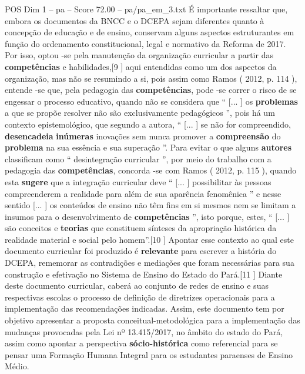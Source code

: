 \begin{textsample}{POS Dim 1 – pa – Score 72.00 – pa/pa\_em\_3.txt}
É importante ressaltar que, embora os documentos da BNCC e o DCEPA sejam diferentes quanto à concepção de educação e de ensino, conservam alguns aspectos estruturantes em função do ordenamento constitucional, legal e normativo da Reforma de 2017.
Por isso, optou -se pela manutenção da organização curricular a partir das \textbf{competências} e habilidades,[9 ] aqui entendidas como um dos aspectos da organização, mas não se resumindo a si, pois assim como Ramos ( 2012, p. 114 ), entende -se que, pela pedagogia das \textbf{competências}, pode -se correr o risco de se engessar o processo educativo, quando não se considera que “ [... ] os \textbf{problemas} a que se propõe resolver não são exclusivamente pedagógicos ”, pois há um contexto epistemológico, que segundo a autora, “ [... ] se não for compreendido, \textbf{desencadeia} \textbf{inúmeras} inovações sem nunca promover a \textbf{compreensão} do \textbf{problema} na sua essência e sua superação ”.
Para evitar o que alguns \textbf{autores} classificam como “ desintegração curricular ”, por meio do trabalho com a pedagogia das \textbf{competências}, concorda -se com Ramos ( 2012, p. 115 ), quando esta \textbf{sugere} que a integração curricular deve “ [... ] possibilitar às pessoas compreenderem a realidade para além de sua aparência fenomênica ” e nesse sentido [... ] os conteúdos de ensino não têm fins em si mesmos nem se limitam a insumos para o desenvolvimento de \textbf{competências} ”, isto porque, estes, “ [... ] são conceitos e \textbf{teorias} que constituem sínteses da apropriação histórica da realidade material e social pelo homem”.[10 ] Apontar esse contexto ao qual este documento curricular foi produzido é \textbf{relevante} para escrever a história do DCEPA, rememorar as contradições e mediações que foram necessárias para sua construção e efetivação no Sistema de Ensino do Estado do Pará.[11 ] Diante deste documento curricular, caberá ao conjunto de redes de ensino e suas respectivas escolas o processo de definição de diretrizes operacionais para a implementação das recomendações indicadas.
Assim, este documento tem por objetivo apresentar a proposta conceitual-metodológica para a implementação das mudanças provocadas pela Lei nº 13.415/2017, no âmbito do estado do Pará, assim como apontar a perspectiva \textbf{sócio-histórica} como referencial para se pensar uma Formação Humana Integral para os estudantes paraenses de Ensino Médio.

\end{textsample}

